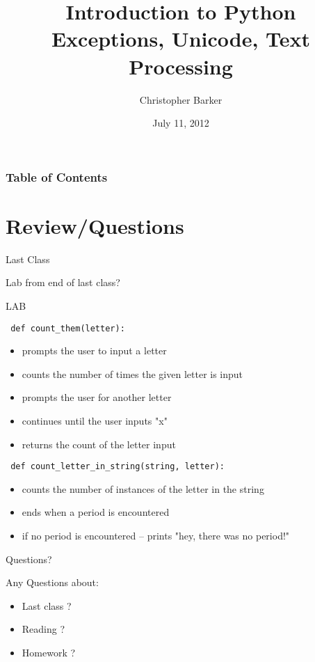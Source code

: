 \documentclass{beamer}
\title[Intro to Python: Week 2]{Introduction  to Python\\ Exceptions, Unicode, Text Processing}
\author{Christopher Barker}
\institute{UW Continuing Education / Isilon}
\date{July 11, 2012}
\begin{document}
\begin{frame}
  \titlepage
\end{frame}

\begin{frame}
\frametitle{Table of Contents}
  \tableofcontents
\end{frame}

\section{Review/Questions}


\begin{frame}{Last Class}

{\Large Lab from end of last class?  }

\end{frame}


\begin{frame}[fragile]{LAB}

\verb| def count_them(letter): |
\begin{itemize}
  \item prompts the user to input a letter
  \item counts the number of times the given letter is input
  \item prompts the user for another letter
  \item continues until the user inputs "x"
  \item returns the count of the letter input
\end{itemize}

\verb| def count_letter_in_string(string, letter): |
\begin{itemize}
  \item counts the number of instances of the letter in the string
  \item ends when a period is encountered
  \item if no period is encountered -- prints "hey, there was no period!"
\end{itemize}
\end{frame}


\begin{frame}{Questions?}

{\Large Any Questions about:
\begin{itemize}
  \item Last class ?
  \item Reading ?
  \item Homework ?
\end{itemize}
}
\end{frame}
\end{document}
